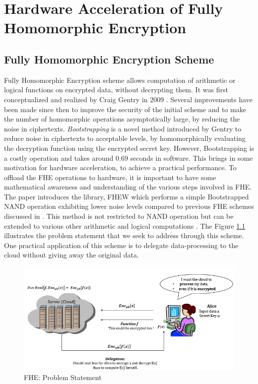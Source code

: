 \chapter{Hardware Acceleration of Fully Homomorphic Encryption}
\label{ch4_fhew}

\section{Fully Homomorphic Encryption Scheme}
\label{4_1}
Fully Homomorphic Encryption scheme allows computation of arithmetic or logical functions on encrypted data, without decrypting them. It was first conceptualized and realized by Craig Gentry in 2009 \cite{gentry2010computing}.  Several improvements have been made since then to improve the security of the initial scheme \cite{gentry2011implementing}\cite{gentry2012homomorphic}\cite{halevi2014algorithms} and to make the number of homomorphic operations asymptotically large, by reducing the noise in ciphertexts. \textit{Bootstrapping} is a novel method introduced by Gentry to reduce noise in ciphertexts to acceptable levels, by homomorphically evaluating the decryption function using the encrypted secret key. However, Bootstrapping is a costly operation \cite{ducas2015fhew} and takes around 0.69 seconds in software. This brings in some motivation for hardware acceleration, to achieve a practical performance.\newline\newline
To offload the FHE operations to hardware, it is important to have some mathematical awareness and understanding of the various steps involved in FHE. The paper \cite{ducas2015fhew} introduces the library, FHEW \cite{fhew_lib} which performs a simple Bootstrapped NAND operation exhibiting lower noise levels compared to previous FHE schemes discussed in \cite{halevi2014algorithms}\cite{gentry2012homomorphic}. This method is not restricted to NAND operation but can be extended to various other arithmetic and logical computations \cite{ducas2015fhew}. \newline
The Figure \ref{fig:fhew_prob_stmt} illustrates the problem statement that we seek to address through this scheme. One practical application of this scheme is to delegate data-processing to the cloud without giving away the original data. 
\begin{figure}[h!]
 \centering
 \includegraphics[width=\linewidth]{figures/fhew_prob_stmt.PNG}
 \caption{FHE: Problem Statement
 \cite{shai_he}}
 \label{fig:fhew_prob_stmt}
\end{figure}
